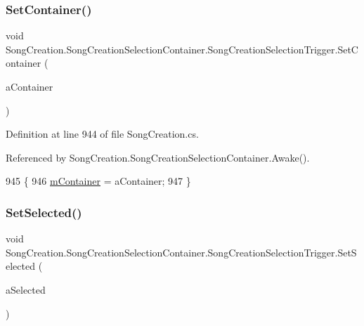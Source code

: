 \subsubsection{\texorpdfstring{Set\+Container()}{SetContainer()}}
{\footnotesize\ttfamily void Song\+Creation.\+Song\+Creation\+Selection\+Container.\+Song\+Creation\+Selection\+Trigger.\+Set\+Container (\begin{DoxyParamCaption}\item[{\hyperlink{class_song_creation_1_1_song_creation_selection_container}{Song\+Creation\+Selection\+Container}}]{a\+Container }\end{DoxyParamCaption})}



Definition at line 944 of file Song\+Creation.\+cs.



Referenced by Song\+Creation.\+Song\+Creation\+Selection\+Container.\+Awake().


\begin{DoxyCode}
945             \{
946                 \hyperlink{class_song_creation_1_1_song_creation_selection_container_1_1_song_creation_selection_trigger_a23a094f17b949a4ea153f66c73e42578}{mContainer} = aContainer;
947             \}
\end{DoxyCode}
\mbox{\label{class_song_creation_1_1_song_creation_selection_container_1_1_song_creation_selection_trigger_a477673c43fb3b828ed54d06d00e93f08}} 
\subsubsection{\texorpdfstring{Set\+Selected()}{SetSelected()}}
{\footnotesize\ttfamily void Song\+Creation.\+Song\+Creation\+Selection\+Container.\+Song\+Creation\+Selection\+Trigger.\+Set\+Selected (\begin{DoxyParamCaption}\item[{bool}]{a\+Selected }\end{DoxyParamCaption})}



